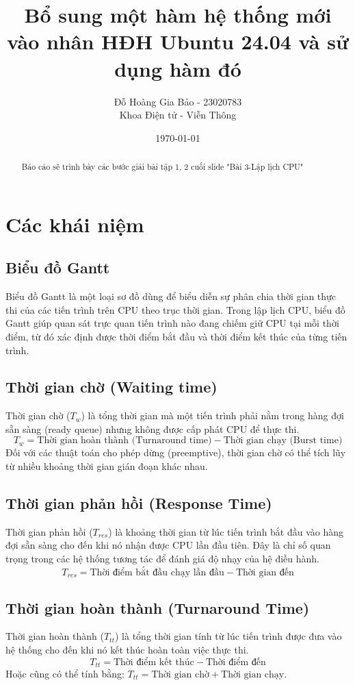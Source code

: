 \documentclass[12pt, letterpaper]{article}
\title{Bổ sung một hàm hệ thống mới vào nhân HĐH Ubuntu 24.04 và sử dụng hàm đó}
\author{Đỗ Hoàng Gia Bảo - 23020783 \\ \small Khoa Điện tử - Viễn Thông}
\date{\today}
\begin{document}
\maketitle

\begin{abstract}
Báo cáo sẽ trình bày các bước giải bài tập 1, 2 cuối slide "Bài 3-Lập lịch CPU"
\end{abstract}
\newpage
\tableofcontents

\newpage
{}
\setcounter{page}{3} %

\section{Các khái niệm}
\subsection{Biểu đồ Gantt}
Biểu đồ Gantt là một loại sơ đồ dùng để biểu diễn sự phân chia thời gian thực thi của các tiến trình trên CPU theo trục thời gian. Trong lập lịch CPU, biểu đồ Gantt giúp quan sát trực quan tiến trình nào đang chiếm giữ CPU tại mỗi thời điểm, từ đó xác định được thời điểm bắt đầu và thời điểm kết thúc của từng tiến trình.
\subsection{Thời gian chờ (Waiting time)}
Thời gian chờ ($T_w$) là tổng thời gian mà một tiến trình phải nằm trong hàng đợi sẵn sàng (ready queue) nhưng không được cấp phát CPU để thực thi. 
\[ T_w = \text{Thời gian hoàn thành (Turnaround time)} - \text{Thời gian chạy (Burst time)} \]
Đối với các thuật toán cho phép dừng (preemptive), thời gian chờ có thể tích lũy từ nhiều khoảng thời gian gián đoạn khác nhau.
\subsection{Thời gian phản hồi (Response Time)}
Thời gian phản hồi ($T_{res}$) là khoảng thời gian từ lúc tiến trình bắt đầu vào hàng đợi sẵn sàng cho đến khi nó nhận được CPU lần đầu tiên. Đây là chỉ số quan trọng trong các hệ thống tương tác để đánh giá độ nhạy của hệ điều hành.
\[ T_{res} = \text{Thời điểm bắt đầu chạy lần đầu} - \text{Thời gian đến} \]
\subsection{Thời gian hoàn thành (Turnaround Time)}
Thời gian hoàn thành ($T_{tt}$) là tổng thời gian tính từ lúc tiến trình được đưa vào hệ thống cho đến khi nó kết thúc hoàn toàn việc thực thi.
\[ T_{tt} = \text{Thời điểm kết thúc} - \text{Thời điểm đến} \]
Hoặc cũng có thể tính bằng: $T_{tt} = \text{Thời gian chờ} + \text{Thời gian chạy}$.
\end{document}
